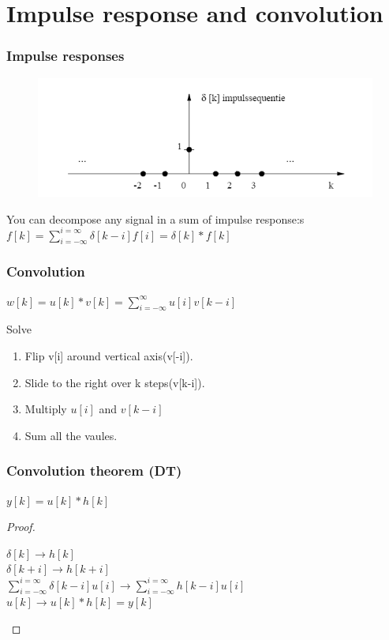 \section{Impulse response and convolution}
\begin{frame}
	\frametitle{Impulse responses }
	\begin{definition}
	\end{definition}
	\begin{figure}
\centering
\includegraphics[width=0.6\linewidth]{Images/discrete_time_systems_19}
\label{fig:discrete_time_systems_19}
\end{figure}
\begin{theorem}
	You can decompose any signal in a sum of impulse response:s\\
	$f[k]=\sum\limits_{i=-\infty}^{i=\infty}\delta[k-i]f[i] = \delta[k] \ast f[k]$
\end{theorem}
\end{frame}
\begin{frame}
	\frametitle{Convolution}
	\begin{definition}
		$w[k]=u[k]\ast v[k] = \sum\limits_{i=-\infty}^{\infty} u[i]v[k-i]$
	\end{definition}
	\begin{block}{Solve}
		\begin{enumerate}
			\item Flip v[i] around vertical axis(v[-i]).
			\item Slide to the right over k steps(v[k-i]).
			\item Multiply $u[i]$ and $v[k-i]$
			\item Sum all the vaules.
		\end{enumerate}
	\end{block}
\end{frame}
\begin{frame}
	\frametitle{Convolution theorem (DT)}
	\begin{theorem}
		$y[k] = u[k] \ast h[k]$
	\end{theorem}
	\begin{proof}
		\begin{center}
				$ \delta[k] \rightarrow h[k]$\\
				$ \delta[k+i] \rightarrow h[k+i]$\\
				$ \sum\limits_{i=-\infty}^{i=\infty}\delta[k-i]u[i] \rightarrow \sum\limits_{i=-\infty}^{i=\infty}h[k-i]u[i]$\\
				$u[k] \rightarrow u[k] \ast h[k] = y[k] $
		\end{center}
	\end{proof}
\end{frame}
